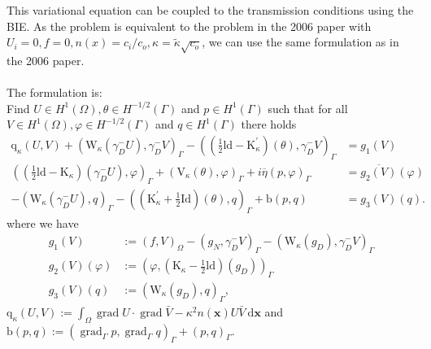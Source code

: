 \documentclass[10pt,journal,compsoc, onecolumn]{IEEEtran}
\begin{document}
This variational equation can be coupled to the transmission conditions using the BIE. 
As the problem is equivalent to the problem in the 2006 paper with $U_i = 0, f = 0, n(x) = c_i / c_o, 
\kappa = \tilde \kappa \sqrt{c_o}$, 
we can use the same formulation as in the 2006 paper.\\
\\
The formulation is: \\ 
Find \(U \in H^{1}(\Omega), \theta \in H^{-1 / 2}(\Gamma)\) and \(p \in H^{1}(\Gamma)\) such that for all \(V \in H^{1}(\Omega), \varphi \in H^{-1 / 2}(\Gamma)\)
and \(q \in H^{1}(\Gamma)\) there holds
$$
\begin{aligned}
    \mathrm{q}_{\kappa}(U, V)+\left(\mathrm{W}_{\kappa}\left(\gamma_{D}^{-} U\right), \gamma_{D}^{-} V\right)_{\Gamma}-\left((\frac{1}{2} \mathrm{ld}-\mathrm{K}_{\kappa}^{\prime})(\theta), \gamma_{D}^{-} V\right)_{\Gamma} &=g_1(V) \\
    \left((\frac{1}{2} \mathrm{ld}-\mathrm{K}_{\kappa})\left(\gamma_{D}^{-} U\right), \varphi\right)_{\Gamma}+\left(\mathrm{V}_{\kappa}(\theta), \varphi\right)_{\Gamma}+i \overline{\eta}(p, \varphi)_{\Gamma} &=\overline{g_2(V)}(\varphi) \\
    -\left(\mathrm{W}_{\kappa}\left(\gamma_{D}^{-} U\right), q\right)_{\Gamma}-\left((\mathrm{K}_{\kappa}^{\prime}+\frac{1}{2} \mathrm{Id})(\theta), q\right)_{\Gamma}+\mathrm{b}(p, q) &=g_3(V)(q).
\end{aligned}
$$
where we have 
$$
\begin{aligned} 
    g_1(V) &:=(f, V)_{\Omega}-\left(g_{N}, \gamma_{D}^{-} V\right)_{\Gamma}-\left(\mathrm{W}_{\kappa}\left(g_{D}\right), \gamma_{D}^{-} V\right)_{\Gamma} \\ 
    g_2(V)(\varphi) &:=\left(\varphi,\left(\mathrm{K}_{\kappa}-\frac{1}{2} \mathrm{ld}\right)\left(g_{D}\right)\right)_{\Gamma} \\ 
    g_3(V)(q) &:=\left(\mathrm{W}_{\kappa}\left(g_{D}\right), q\right)_{\Gamma}, 
\end{aligned}
$$
\(\mathrm{q}_{\kappa}(U, V):=\int_{\Omega} \operatorname{grad} U \cdot \operatorname{grad} \bar{V}-\kappa^{2} n(\mathbf{x}) U \bar{V} \mathrm{~d} \mathbf{x}\) and 
\(\mathrm{b}(p, q):=\left(\operatorname{grad}_{\Gamma} p, \operatorname{grad}_{\Gamma} q\right)_{\Gamma}+(p, q)_{\Gamma}\).
\end{document}
